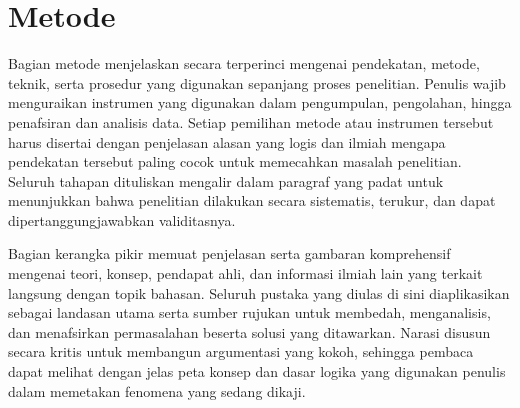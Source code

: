 %
%
\section{Metode}

Bagian metode menjelaskan secara terperinci mengenai pendekatan, metode, teknik, serta prosedur yang digunakan sepanjang proses penelitian. Penulis wajib menguraikan instrumen yang digunakan dalam pengumpulan, pengolahan, hingga penafsiran dan analisis data. Setiap pemilihan metode atau instrumen tersebut harus disertai dengan penjelasan alasan yang logis dan ilmiah mengapa pendekatan tersebut paling cocok untuk memecahkan masalah penelitian. Seluruh tahapan dituliskan mengalir dalam paragraf yang padat untuk menunjukkan bahwa penelitian dilakukan secara sistematis, terukur, dan dapat dipertanggungjawabkan validitasnya.

Bagian kerangka pikir memuat penjelasan serta gambaran komprehensif mengenai teori, konsep, pendapat ahli, dan informasi ilmiah lain yang terkait langsung dengan topik bahasan. Seluruh pustaka yang diulas di sini diaplikasikan sebagai landasan utama serta sumber rujukan untuk membedah, menganalisis, dan menafsirkan permasalahan beserta solusi yang ditawarkan. Narasi disusun secara kritis untuk membangun argumentasi yang kokoh, sehingga pembaca dapat melihat dengan jelas peta konsep dan dasar logika yang digunakan penulis dalam memetakan fenomena yang sedang dikaji.